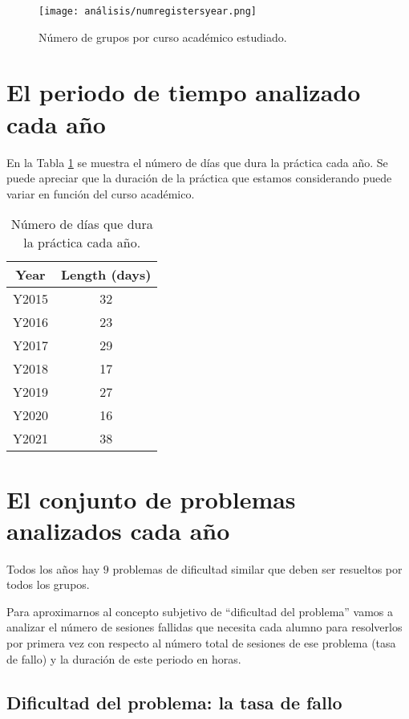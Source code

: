 \begin{figure}[H]
    \centering
    \texttt{[image: análisis/numregistersyear.png]}
    \caption{Número de grupos por curso académico estudiado.}
    \label{fig:groupsperyear}
\end{figure}

\section{El periodo de tiempo analizado cada año}

En la Tabla \ref{tab:days} se muestra el número de días que dura la práctica cada año. Se puede apreciar que la duración de la práctica que estamos considerando puede variar en función del curso académico.

\begin{table}[H]
\centering
\caption{Número de días que dura la práctica cada año.}
\label{tab:days}
\begin{tabular}{cc}
\hline
\textbf{Year}  & \textbf{Length (days)}  \\ \hline
Y2015 & 32 \\
Y2016 & 23 \\
Y2017 & 29 \\
Y2018 & 17 \\
Y2019 & 27 \\
Y2020 & 16 \\
Y2021 & 38 \\ \hline
\end{tabular}
\end{table}

\section{El conjunto de problemas analizados cada año}

Todos los años hay $9$ problemas de dificultad similar que deben ser resueltos por todos los grupos.

Para aproximarnos al concepto subjetivo de ``dificultad del problema'' vamos a analizar el número de sesiones fallidas que necesita cada alumno para resolverlos por primera vez con respecto al número total de sesiones de ese problema (tasa de fallo) y la duración de este periodo en horas.

\subsection{Dificultad del problema: la tasa de fallo}

